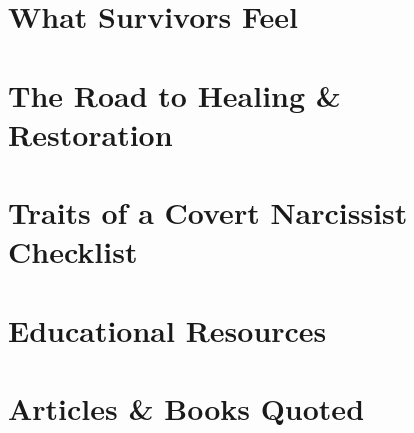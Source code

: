 \documentclass{article}
\numberwithin{equation}{section}
\begin{document}

\section{What Survivors Feel}


\section{The Road to Healing \& Restoration}


\section{Traits of a Covert Narcissist Checklist}


\section{Educational Resources}


\section{Articles \& Books Quoted}


\printbibliography[heading=bibintoc]
	
\end{document}
